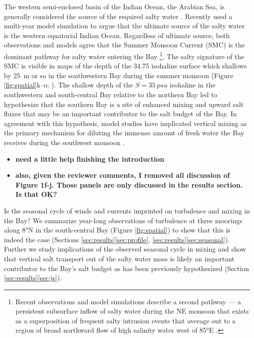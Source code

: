 \documentclass[twocol]{ametsoc}
\begin{document}
The western semi-enclosed basin of the Indian Ocean, the Arabian Sea, is generally considered the source of the required salty water \citep[for example, ][]{Jensen2001}.
Recently \cite{Sanchez-Franks2019} used a multi-year model simulation to argue that the ultimate source of the salty water is the western equatorial Indian Ocean.
Regardless of ultimate source, both observations and models agree that the Summer Monsoon Current (SMC) is the dominant pathway for salty water entering the Bay \citep{Jensen2001,Vinayachandran2013,Webber2018}\footnote{Recent observations and model simulations describe a second pathway — a persistent subsurface inflow of salty water during the NE monsoon that exists as a superposition of frequent salty intrusion events that average out to a region of broad northward flow of high salinity water west of 85°E \citep{Wijesekera2015,Jensen2016}.}.
The salty signature of the SMC is visible in maps of the depth of the 34.75 isohaline surface which shallows by \SI{25}{m} or so in the southwestern Bay during the summer monsoon (Figure \ref{fig:spatial}k--o; \citealp{Murty1992a,Vinayachandran2013}).
The shallow depth of the \(S = \SI{35}{psu}\) isohaline in the southwestern and south-central Bay relative to the northern Bay led \cite{Vinayachandran2013} to hypothesize that the southern Bay is a site of enhanced mixing and upward salt fluxes that may be an important contributor to the salt budget of the Bay.
In agreement with this hypothesis, model studies have implicated vertical mixing as the primary mechanism for diluting the immense amount of fresh water the Bay receives during the southwest monsoon \citep{Akhil2014,Benshila2014,Wilson2016a}.

\begin{itemize}
\item \textbf{need a little help finishing the introduction}
\item \textbf{also, given the reviewer comments, I removed all discussion of Figure 1f-j. Those panels are only discussed in the results section. Is that OK?}
\end{itemize}
Is the seasonal cycle of winds and currents imprinted on turbulence and mixing in the Bay?
We summarize year-long observations of turbulence at three moorings along 8°N in the south-central Bay (Figure \ref{fig:spatial}) to show that this is indeed the case (Sections \ref{sec:results}\ref{sec:profile}, \ref{sec:results}\ref{sec:seasonal}).
Further we study implications of the observed seasonal cycle in mixing and show that vertical salt transport out of the salty water mass is likely an important contributor to the Bay's salt budget as has been previously hypothesized (Section \ref{sec:results}\ref{sec:js}).
\end{document}
